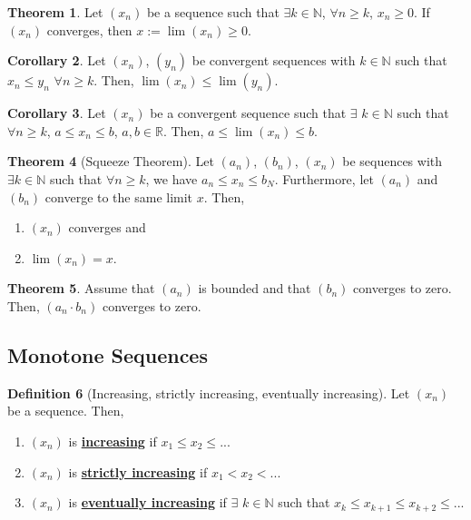 \documentclass[reqno,11pt]{amsart}
\theoremstyle{definition}
\newtheorem{theorem}{Theorem}
\newtheorem{corollary}[theorem]{Corollary}
\theoremstyle{definition}
\newtheorem{definition}[theorem]{Definition}
\theoremstyle{remark}
\newcommand{\R}{\mathbb{R}}
\newcommand{\N}{\mathbb{N}}
\newcommand{\dfn}[1]{\underline{\textbf{#1}}}
\begin{document}
\begin{theorem}
	Let $(x_n)$ be a sequence such that $\exists k \in \N$, $\forall n \geq k$, $x_n \geq 0$. If $(x_n)$ converges, then $x:= \lim(x_n) \geq 0$.
\end{theorem}

\begin{corollary}
	Let $(x_n)$, $(y_n)$ be convergent sequences with $k \in \N$ such that $x_n \leq y_n$ $\forall n \geq k$. Then, $\lim(x_n) \leq \lim(y_n)$.
\end{corollary}

\begin{corollary}
	Let $(x_n)$ be a convergent sequence such that $\exists$ $k \in \N$ such that $\forall n \geq k$, $a \leq x_n \leq b$, $a, b \in \R$. Then, $a \leq \lim (x_n) \leq b$.
\end{corollary}

\begin{theorem}[Squeeze Theorem]
	Let $(a_n)$, $(b_n)$, $(x_n)$ be sequences with $\exists k \in \N$ such that $\forall n \geq k$, we have $a_n \leq x_n \leq b_N$. Furthermore, let $(a_n)$ and $(b_n)$ converge to the same limit $x$. Then, 
	\begin{enumerate}[noitemsep]
		\item $(x_n)$ converges and 
		\item $\lim(x_n) = x$.
	\end{enumerate}
\end{theorem}

\begin{theorem}
	Assume that $(a_n)$ is bounded and that $(b_n)$ converges to zero. Then, $(a_n \cdot b_n)$ converges to zero.
\end{theorem}

\subsection{Monotone Sequences}
\begin{definition}[Increasing, strictly increasing, eventually increasing]
	Let $(x_n)$ be a sequence. Then, 
	\begin{enumerate}[noitemsep]
		\item $(x_n)$ is \dfn{increasing} if $x_1 \leq x_2 \leq ...$ 
		\item $(x_n)$ is \dfn{strictly increasing} if $x_1 < x_2 < ...$
		\item $(x_n)$ is \dfn{eventually increasing} if $\exists$ $k \in \N$ such that $x_k \leq x_{k+1} \leq x_{k+2} \leq ...$
	\end{enumerate}
\end{definition}
\end{document}
